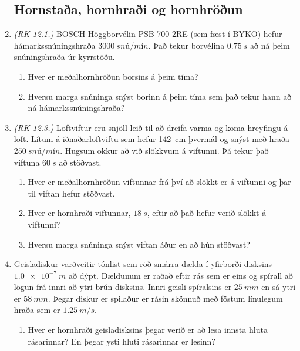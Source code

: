 \ifdefined \wholebook \else\documentclass[oneside]{book}\usepackage{EdlBook}\graphicspath{{figures/}}
\begin{document}
\begin{enumerate}[label = \textbf{Dæmi \thechapter.\arabic*.}]

\subsection*{Hornstaða, hornhraði og hornhröðun}

\item \textit{(RK 12.1.)} BOSCH Höggborvélin PSB 700-2RE (sem fæst í BYKO) hefur hámarkssnúningshraða $\SI{3000}{snú/mín}$. Það tekur borvélina $\SI{0.75}{s}$ að ná þeim snúningshraða úr kyrrstöðu.
\begin{enumerate}[label = \textbf{(\alph*)}]
    \item Hver er meðalhornhröðun borsins á þeim tíma?
    \item Hversu marga snúninga snýst borinn á þeim tíma sem það tekur hann að ná hámarkssnúningshraða?
\end{enumerate}

\item \textit{(RK 12.3.)} Loftviftur eru snjöll leið til að dreifa varma og koma hreyfingu á loft. Lítum á iðnaðarloftviftu sem hefur \SI{142}{cm} þvermál og snýst með hraða $\SI{250}{snú/mín}$. Hugsum okkur að við slökkvum á viftunni. Þá tekur það viftuna $\SI{60}{s}$ að stöðvast.

\begin{enumerate}[label = \textbf{(\alph*)}]
    \item Hver er meðalhornhröðun viftunnar frá því að slökkt er á viftunni og þar til viftan hefur stöðvast.
    \item Hver er hornhraði viftunnar, $\SI{18}{s}$, eftir að það hefur verið slökkt á viftunni?
    \item Hversu marga snúninga snýst viftan áður en að hún stöðvast?
\end{enumerate}

\item Geisladiskur varðveitir tónlist sem röð smárra dælda í yfirborði disksins $\SI{1.0e-7}{m}$ að dýpt. Dældunum er raðað eftir rás sem er eins og spírall að lögun frá innri að ytri brún disksins. Innri geisli spíralsins er $\SI{25}{mm}$ en sá ytri er $\SI{58}{mm}$. Þegar diskur er spilaður er rásin skönnuð með föstum línulegum hraða sem er $\SI{1.25}{m/s}$.

\begin{enumerate}[label = \textbf{(\alph*)}]
    \item Hver er hornhraði geisladisksins þegar verið er að lesa innsta hluta rásarinnar? En þegar ysti hluti rásarinnar er lesinn?
    

\end{enumerate}
\end{enumerate}
\end{document}
